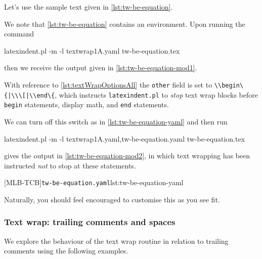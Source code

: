  \begin{example}
  Let's use the sample text given in \cref{lst:tw-be-equation}.  


  We note that \cref{lst:tw-be-equation} contains an environment. Upon running the command
  \begin{commandshell}
latexindent.pl -m -l textwrap1A.yaml tw-be-equation.tex
\end{commandshell}
  then we receive the output given in \cref{lst:tw-be-equation-mod1}.


  With reference to \vref{lst:textWrapOptionsAll} the \texttt{other} field is set to
  \lstinline!\\begin\{|\\\[|\\end\{!, which instructs \texttt{latexindent.pl} to
  \emph{stop} text wrap blocks before \texttt{begin} statements, display math, and
  \texttt{end} statements.

  We can turn off this switch as in \cref{lst:tw-be-equation-yaml} and then run
  \begin{widepage}
   \begin{commandshell}
latexindent.pl -m -l textwrap1A.yaml,tw-be-equation.yaml tw-be-equation.tex
\end{commandshell}
  \end{widepage}
  gives the output in \cref{lst:tw-be-equation-mod2}, in which text wrapping has been
  instructed \emph{not} to stop at these statements.

  [MLB-TCB]{\texttt{tw-be-equation.yaml}}{lst:tw-be-equation-yaml}

  \begin{widepage}
  \end{widepage}

  Naturally, you should feel encouraged to customise this as you see fit.
 \end{example}

\subsubsection{Text wrap: trailing comments and spaces}
 We explore the behaviour of the text wrap routine in relation to trailing comments using
 the following examples.

